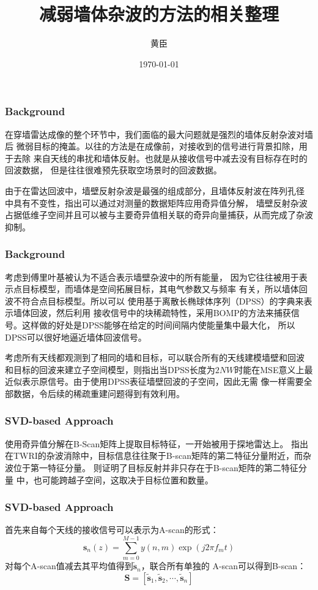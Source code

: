 \documentclass[11pt]{beamer}
\begin{document}
 
\title{减弱墙体杂波的方法的相关整理}  
\author{黄臣}  
\date{\today}  
\frame{\titlepage}  
\begin{frame}
  \frametitle{Background}
  在穿墙雷达成像的整个环节中，我们面临的最大问题就是强烈的墙体反射杂波对墙后
  微弱目标的掩盖。以往的方法是在成像前，对接收到的信号进行背景扣除，用于去除
  来自天线的串扰和墙体反射。也就是从接收信号中减去没有目标存在时的回波数据，
  但是往往很难预先获取空场景时的回波数据\citep{Ahmad2015Wall}。
  \par 由于在雷达回波中，墙壁反射杂波是最强的组成部分，且墙体反射波在阵列孔径
  中具有不变性，\citep{Tivive2011An}指出可以通过对测量的数据矩阵应用奇异值分解，
  墙壁反射杂波占据低维子空间并且可以被与主要奇异值相关联的奇异向量捕获，从而完成了杂波抑制。

\end{frame}
\begin{frame}
  \frametitle{Background}
  考虑到傅里叶基被认为不适合表示墙壁杂波中的所有能量，
  因为它往往被用于表示点目标模型，而墙体是空间拓展目标，其电气参数又与频率
  有关，所以墙体回波不符合点目标模型\citep{Ahmad2015Wall}。所以可以
  使用基于离散长椭球体序列（DPSS）的字典来表示墙体回波，然后利用
  接收信号中的块稀疏特性，采用BOMP的方法来捕获信号\citep{Ahmad2015Wall}。这样做的好处是DPSS能够在给定的时间间隔内使能量集中最大化，
  所以DPSS可以很好地逼近墙体回波信号\citep{Slepian1978Prolate}\citep{Zhu2015Approximating}。
  \par 考虑所有天线都观测到了相同的墙和目标，可以联合所有的天线建模墙壁和回波
  和目标的回波来建立子空间模型，\citep{Davenport2011Compressive}则指出当DPSS长度为$2NW$时能在MSE意义上最近似表示原信号。由于使用DPSS表征墙壁回波的子空间，因此无需
  像\citep{Tivive2011An}一样需要全部数据，令后续的稀疏重建问题得到有效利用\citep{Zhu2016On}。
\end{frame}
\begin{frame}
  \frametitle{SVD-based Approach}
  使用奇异值分解在B-Scan矩阵上提取目标特征，一开始被用于探地雷达上。\citep{Chandra2008An}\citep{Verma2009Analysis}
  指出在TWRI的杂波消除中，目标信息往往聚于B-scan矩阵的第二特征分量附近，而杂波位于第一特征分量。
  \citep{Tivive2011An}则证明了目标反射并非只存在于B-scan矩阵的第二特征分量
  中，也可能跨越子空间，这取决于目标位置和数量。
\end{frame}
\begin{frame}
  \frametitle{SVD-based Approach}
  首先来自每个天线的接收信号可以表示为A-scan的形式：
  \begin{equation}
	{\boldsymbol s}_{n}(z)=\sum_{m=0}^{M-1}y(n, m)\exp(j2\pi f_{m}t)
  \end{equation}
  对每个A-scan值减去其平均值得到$\tilde{{\boldsymbol s}}_{n}$，联合所有单独的
  A-scan可以得到B-scan：
  \begin{equation}
	{\boldsymbol S}=[\tilde{{\boldsymbol s}}_{1},\tilde{{\boldsymbol s}}_{2}, \cdots,\tilde{{\boldsymbol s}}_{n}]
  \end{equation}
\end{frame}
\end{document}
